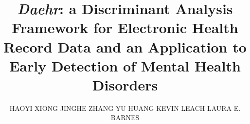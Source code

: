 \documentclass[prodmode,acmtist]{acmsmall}
\newcommand{\TheName}{\mbox{\emph{Daehr}}}
\begin{document}
\title{\TheName{}: a Discriminant Analysis Framework for Electronic Health Record Data and an Application to Early Detection of Mental Health Disorders}

\author{
HAOYI XIONG
JINGHE ZHANG
YU HUANG
KEVIN LEACH
LAURA E. BARNES
}



\maketitle

%



\end{document}
